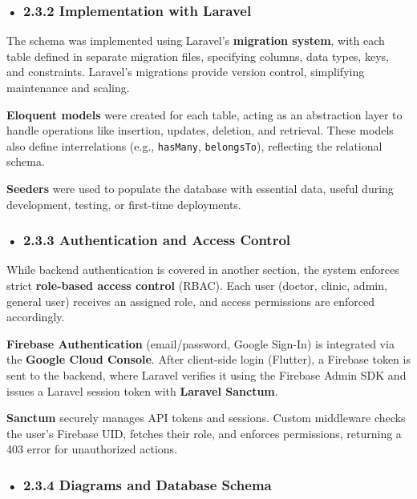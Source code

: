 \documentclass[12pt]{report}
\begin{document}
\subsubsection*{• 2.3.2 Implementation with Laravel}

The schema was implemented using Laravel’s \textbf{migration system}, with each table defined in separate migration files, specifying columns, data types, keys, and constraints. Laravel’s migrations provide version control, simplifying maintenance and scaling.

\noindent \textbf{Eloquent models} were created for each table, acting as an abstraction layer to handle operations like insertion, updates, deletion, and retrieval. These models also define interrelations (e.g., \texttt{hasMany}, \texttt{belongsTo}), reflecting the relational schema.

\noindent \textbf{Seeders} were used to populate the database with essential data, useful during development, testing, or first-time deployments.

\vspace{0.5cm}

\subsubsection*{• 2.3.3 Authentication and Access Control}

While backend authentication is covered in another section, the system enforces strict \textbf{role-based access control} (RBAC). Each user (doctor, clinic, admin, general user) receives an assigned role, and access permissions are enforced accordingly.

\noindent \textbf{Firebase Authentication} (email/password, Google Sign-In) is integrated via the \textbf{Google Cloud Console}. After client-side login (Flutter), a Firebase token is sent to the backend, where Laravel verifies it using the Firebase Admin SDK and issues a Laravel session token with \textbf{Laravel Sanctum}.

\noindent \textbf{Sanctum} securely manages API tokens and sessions. Custom middleware checks the user’s Firebase UID, fetches their role, and enforces permissions, returning a 403 error for unauthorized actions.

\vspace{0.5cm}

\subsubsection*{• 2.3.4 Diagrams and Database Schema}
\end{document}
